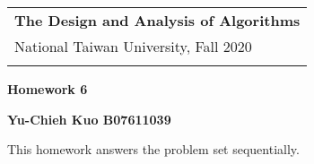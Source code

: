 \documentclass[a4paper,12pt]{article}
\begin{document}
\thispagestyle{plain} %

\begin{tabular}{p{15.5cm}} %
{\large \bf The Design and Analysis of Algorithms} \\
National Taiwan University, Fall 2020  \\
\hline %
\\
\end{tabular} %

\vspace*{0.3cm} %

\begin{center} %
	{\Large \bf Homework 6} %
	\vspace{2mm}
	
	{\bf Yu-Chieh Kuo B07611039} %
		
\end{center}  
\vspace{0.4cm}

This homework answers the problem set sequentially. 
\end{document}
